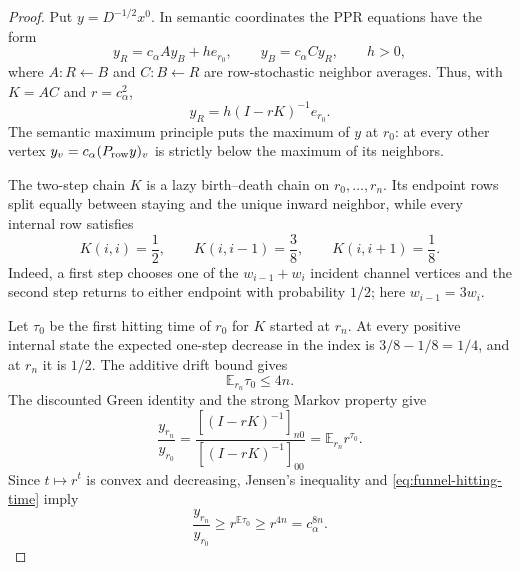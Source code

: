 \begin{proof}
Put $y=D^{-1/2}x^0$.  In semantic coordinates the PPR equations have the form
\begin{equation}
 y_R=c_\alpha Ay_B+h e_{r_0},
 \qquad
 y_B=c_\alpha Cy_R,
 \qquad h>0,
 \label{eq:funnel-semantic-ppr}
\end{equation}
where $A:R\leftarrow B$ and $C:B\leftarrow R$ are row-stochastic neighbor
averages.  Thus, with $K=AC$ and $r=c_\alpha^2$,
\begin{equation}
 y_R=h(I-rK)^{-1}e_{r_0}.
 \label{eq:funnel-even-green}
\end{equation}
The semantic maximum principle puts the maximum of $y$ at $r_0$: at every
other vertex $y_v=c_\alpha(P_{\rm row}y)_v$ is strictly below the maximum of
its neighbors.

The two-step chain $K$ is a lazy birth--death chain on
$r_0,\ldots,r_n$.  Its endpoint rows split equally between staying and the
unique inward neighbor, while every internal row satisfies
\begin{equation}
 K(i,i)=\frac12,
 \qquad
 K(i,i-1)=\frac38,
 \qquad
 K(i,i+1)=\frac18.
 \label{eq:funnel-two-step-chain}
\end{equation}
Indeed, a first step chooses one of the $w_{i-1}+w_i$ incident channel
vertices and the second step returns to either endpoint with probability
$1/2$; here $w_{i-1}=3w_i$.

Let $\tau_0$ be the first hitting time of $r_0$ for $K$ started at $r_n$.
At every positive internal state the expected one-step decrease in the index
is $3/8-1/8=1/4$, and at $r_n$ it is $1/2$.  The additive drift bound gives
\begin{equation}
 \mathbb E_{r_n}\tau_0\leq4n.
 \label{eq:funnel-hitting-time}
\end{equation}
The discounted Green identity and the strong Markov property give
\begin{equation}
 \frac{y_{r_n}}{y_{r_0}}
 =\frac{[(I-rK)^{-1}]_{n0}}{[(I-rK)^{-1}]_{00}}
 =\mathbb E_{r_n}r^{\tau_0}.
 \label{eq:funnel-discounted-hitting}
\end{equation}
Since $t\mapsto r^t$ is convex and decreasing, Jensen's inequality and
\eqref{eq:funnel-hitting-time} imply
\begin{equation}
 \frac{y_{r_n}}{y_{r_0}}
 \geq r^{\mathbb E\tau_0}
 \geq r^{4n}=c_\alpha^{8n}.
 \label{eq:funnel-green-ratio-lower}
\end{equation}


\end{proof}
